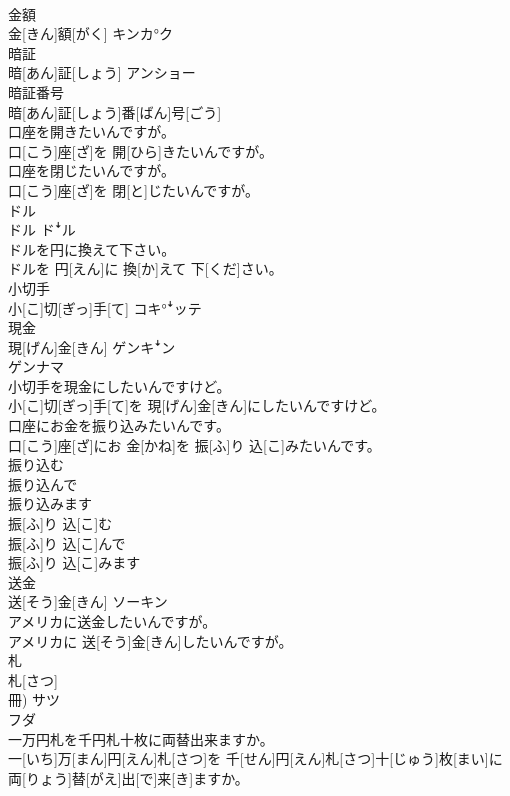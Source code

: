 \documentclass[8pt]{extreport}
\begin{document}
\begin{CJK}{UTF8}{min}
\\	金額	
\\	金[きん]額[がく]	キンカ°ク
\\	暗証	
\\	暗[あん]証[しょう]	アンショー
\\	暗証番号	
\\	暗[あん]証[しょう]番[ばん]号[ごう]	
\\	口座を開きたいんですが。	
\\	口[こう]座[ざ]を 開[ひら]きたいんですが。
\\	口座を閉じたいんですが。	
\\	口[こう]座[ざ]を 閉[と]じたいんですが。
\\	ドル	
\\	ドル	ドꜜル
\\	ドルを円に換えて下さい。	
\\	ドルを 円[えん]に 換[か]えて 下[くだ]さい。
\\	小切手	
\\	小[こ]切[ぎっ]手[て]	コキ°ꜜッテ
\\	現金	
\\	現[げん]金[きん]	ゲンキꜜン 
\\	ゲンナマ
\\	小切手を現金にしたいんですけど。	
\\	小[こ]切[ぎっ]手[て]を 現[げん]金[きん]にしたいんですけど。
\\	口座にお金を振り込みたいんです。	
\\	口[こう]座[ざ]にお 金[かね]を 振[ふ]り 込[こ]みたいんです。
\\	振り込む 
\\	振り込んで 
\\	振り込みます	
\\	振[ふ]り 込[こ]む 
\\	振[ふ]り 込[こ]んで 
\\	振[ふ]り 込[こ]みます	
\\	送金	
\\	送[そう]金[きん]	ソーキン
\\	アメリカに送金したいんですが。	
\\	アメリカに 送[そう]金[きん]したいんですが。
\\	札	
\\	札[さつ] 
\\	冊)	サツ 
\\	フダ
\\	一万円札を千円札十枚に両替出来ますか。	
\\	一[いち]万[まん]円[えん]札[さつ]を 千[せん]円[えん]札[さつ]十[じゅう]枚[まい]に 両[りょう]替[がえ]出[で]来[き]ますか。

\end{CJK}
\end{document}
